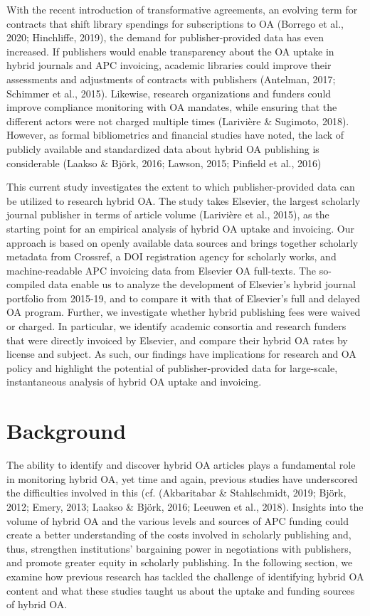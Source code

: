 \documentclass[a4paper,man,floatsintext,longtable,noextraspace,12pt]{apa6}
\begin{document}
With the recent introduction of transformative agreements, an evolving
term for contracts that shift library spendings for subscriptions to OA
(Borrego et al., 2020; Hinchliffe, 2019), the demand for
publisher-provided data has even increased. If publishers would enable
transparency about the OA uptake in hybrid journals and APC invoicing,
academic libraries could improve their assessments and adjustments of
contracts with publishers (Antelman, 2017; Schimmer et al., 2015).
Likewise, research organizations and funders could improve compliance
monitoring with OA mandates, while ensuring that the different actors
were not charged multiple times (Larivière \& Sugimoto, 2018). However,
as formal bibliometrics and financial studies have noted, the lack of
publicly available and standardized data about hybrid OA publishing is
considerable (Laakso \& Björk, 2016; Lawson, 2015; Pinfield et al.,
2016)

This current study investigates the extent to which publisher-provided
data can be utilized to research hybrid OA. The study takes Elsevier,
the largest scholarly journal publisher in terms of article volume
(Larivière et al., 2015), as the starting point for an empirical
analysis of hybrid OA uptake and invoicing. Our approach is based on
openly available data sources and brings together scholarly metadata
from Crossref, a DOI registration agency for scholarly works, and
machine-readable APC invoicing data from Elsevier OA full-texts. The
so-compiled data enable us to analyze the development of Elsevier's
hybrid journal portfolio from 2015-19, and to compare it with that of
Elsevier's full and delayed OA program. Further, we investigate whether
hybrid publishing fees were waived or charged. In particular, we
identify academic consortia and research funders that were directly
invoiced by Elsevier, and compare their hybrid OA rates by license and
subject. As such, our findings have implications for research and OA
policy and highlight the potential of publisher-provided data for
large-scale, instantaneous analysis of hybrid OA uptake and invoicing.

\hypertarget{background}{%
\section{Background}\label{background}}

The ability to identify and discover hybrid OA articles plays a
fundamental role in monitoring hybrid OA, yet time and again, previous
studies have underscored the difficulties involved in this (cf.
(Akbaritabar \& Stahlschmidt, 2019; Björk, 2012; Emery, 2013; Laakso \&
Björk, 2016; Leeuwen et al., 2018). Insights into the volume of hybrid
OA and the various levels and sources of APC funding could create a
better understanding of the costs involved in scholarly publishing and,
thus, strengthen institutions' bargaining power in negotiations with
publishers, and promote greater equity in scholarly publishing. In the
following section, we examine how previous research has tackled the
challenge of identifying hybrid OA content and what these studies taught
us about the uptake and funding sources of hybrid OA.
\end{document}
